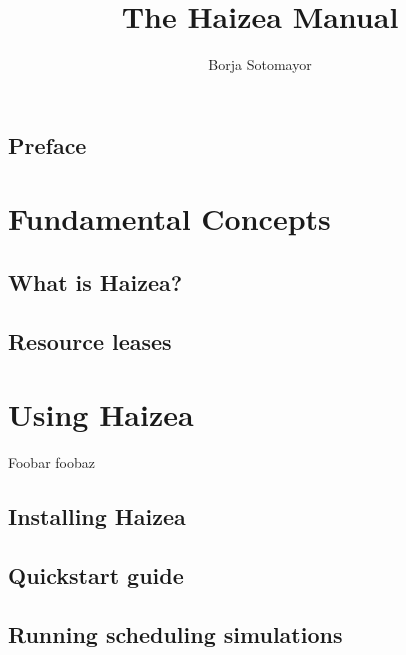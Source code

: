 \documentclass[11pt,oneside]{scrbook}
\begin{document}
\frontmatter
\title{The Haizea Manual}
\author{Borja Sotomayor}

\begin{latexonly}

\end{latexonly}
\begin{htmlonly}
\maketitle
\end{htmlonly}


\tableofcontents

\chapter{Preface}


\mainmatter

\part{Fundamental Concepts}

\chapter{What is Haizea?}



\chapter{Resource leases}



\part{Using Haizea}

Foobar foobaz 

\chapter{Installing Haizea}



\chapter{Quickstart guide}



\chapter{Running scheduling simulations}
\end{document}
